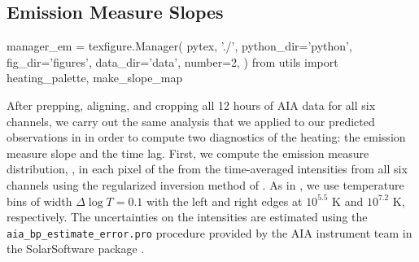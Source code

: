 \subsection{Emission Measure Slopes}\label{sec:em_slopes}

\begin{pycode}[manager_em]
manager_em = texfigure.Manager(
    pytex, './',
    python_dir='python',
    fig_dir='figures',
    data_dir='data',
    number=2,
)
from utils import heating_palette, make_slope_map
\end{pycode}

After prepping, aligning, and cropping all 12 hours of AIA data for all six channels, we carry out the same analysis that we applied to our predicted observations in  in order to compute two diagnostics of the heating: the emission measure slope and the time lag. First, we compute the emission measure distribution, \dem, in each pixel of the \AR{} from the time-averaged intensities from all six channels using the regularized inversion method of \citet{hannah_differential_2012}. As in , we use temperature bins of width $\Delta\log T=0.1$ with the left and right edges at $10^{5.5}$ K and $10^{7.2}$ K, respectively. The uncertainties on the intensities are estimated using the \texttt{aia\_bp\_estimate\_error.pro} procedure provided by the AIA instrument team in the SolarSoftware package \citep[SSW,][]{freeland_data_1998}.  

